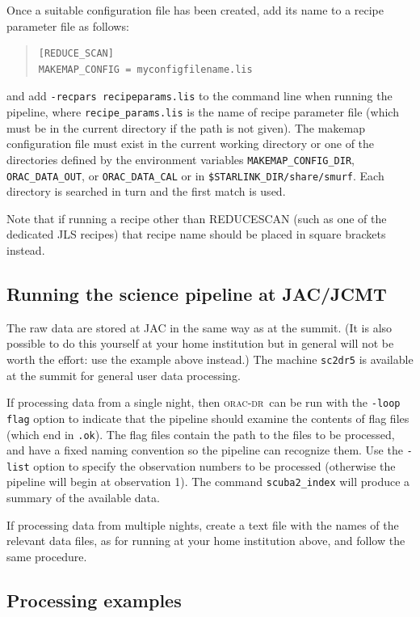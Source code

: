 \documentclass[twoside,11pt]{article}
\renewcommand{\_}{\texttt{\symbol{95}}}
\newenvironment{myquote}{\begin{quote}\begin{small}}{\end{small}\end{quote}}
\newcommand{\oracdr}{\textsc{orac-dr}}
\newcommand{\task}[1]{\textsf{#1}}
\begin{document}
Once a suitable configuration file has been created, add its name to a
recipe parameter file as follows:
\begin{myquote}
\begin{verbatim}
[REDUCE_SCAN]
MAKEMAP_CONFIG = myconfigfilename.lis
\end{verbatim}
\end{myquote}
and add \texttt{-recpars recipe\_params.lis} to the command line when
running the pipeline, where \verb+recipe_params.lis+ is the name of
recipe parameter file (which must be in the current directory if the
path is not given). The \task{makemap} configuration file must exist
in the current working directory or one of the directories defined by
the environment variables \verb+MAKEMAP_CONFIG_DIR+,
\verb+ORAC_DATA_OUT+, or \verb+ORAC_DATA_CAL+ or in
\verb+$STARLINK_DIR/share/smurf+. Each directory is searched in turn
and the first match is used.

Note that if running a recipe other than REDUCE\_SCAN (such as one of
the dedicated JLS recipes) that recipe name should be placed in square
brackets instead.

\subsection{Running the science pipeline at JAC/JCMT}

The raw data are stored at JAC in the same way as at the summit. (It
is also possible to do this yourself at your home institution but in
general will not be worth the effort: use the example above instead.)
The machine \verb+sc2dr5+ is available at the summit for general user
data processing.

If processing data from a single night, then \oracdr\ can be run with
the \texttt{-loop flag} option to indicate that the pipeline should
examine the contents of flag files (which end in \verb+.ok+). The flag
files contain the path to the files to be processed, and have a fixed
naming convention so the pipeline can recognize them. Use the
\texttt{-list} option to specify the observation numbers to be
processed (otherwise the pipeline will begin at observation 1). The
command \verb+scuba2_index+ will produce a summary of the available
data.

If processing data from multiple nights, create a text file with the
names of the relevant data files, as for running at your home
institution above, and follow the same procedure.

\subsection{Processing examples\label{sse:examples}}
\end{document}
